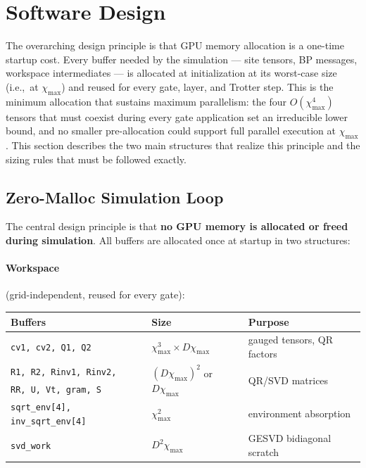 \documentclass[11pt]{article}
\newcommand{\chimax}{\chi_{\mathrm{max}}}
\begin{document}
\section{Software Design}
\label{sec:design}

The overarching design principle is that GPU memory allocation is a one-time
startup cost. Every buffer needed by the simulation --- site tensors, BP messages,
workspace intermediates --- is allocated at initialization at its worst-case size
(i.e.,\ at $\chimax$) and reused for every gate, layer, and Trotter step.
This is the minimum allocation that sustains maximum parallelism: the four
$O(\chimax^4)$ tensors that must coexist during every gate application set
an irreducible lower bound, and no smaller pre-allocation could support full
parallel execution at $\chimax$.
This section describes the two main structures that realize this principle
and the sizing rules that must be followed exactly.

\subsection{Zero-Malloc Simulation Loop}

The central design principle is that \textbf{no GPU memory is allocated or freed
during simulation}. All buffers are allocated once at startup in two structures:

\paragraph{Workspace} (grid-independent, reused for every gate):
\begin{center}
\begin{tabular}{@{}lll@{}}
\toprule
Buffers & Size & Purpose \\
\midrule
\texttt{cv1, cv2, Q1, Q2} & $\chimax^3 \times D\chimax$ & gauged tensors, QR factors \\
\texttt{R1, R2, Rinv1, Rinv2,} & \multirow{2}{*}{$(D\chimax)^2$ or $D\chimax$} & \multirow{2}{*}{QR/SVD matrices} \\
\texttt{RR, U, Vt, gram, S} & & \\
\texttt{sqrt\_env[4], inv\_sqrt\_env[4]} & $\chimax^2$ & environment absorption \\
\texttt{svd\_work} & $D^2\chimax$ & GESVD bidiagonal scratch \\
\bottomrule
\end{tabular}
\end{center}
\end{document}
